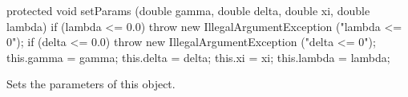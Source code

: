 \begin{hide}\begin{code}

   protected void setParams (double gamma, double delta,
                         double xi, double lambda) {
      if (lambda <= 0.0)
         throw new IllegalArgumentException ("lambda <= 0");
      if (delta <= 0.0)
         throw new IllegalArgumentException ("delta <= 0");
      this.gamma = gamma;
      this.delta = delta;
      this.xi = xi;
      this.lambda = lambda;
   }
\end{code}
\begin{tabb} Sets the parameters of this object.
\end{tabb}
\begin{code}
}\end{code}
\end{hide}
